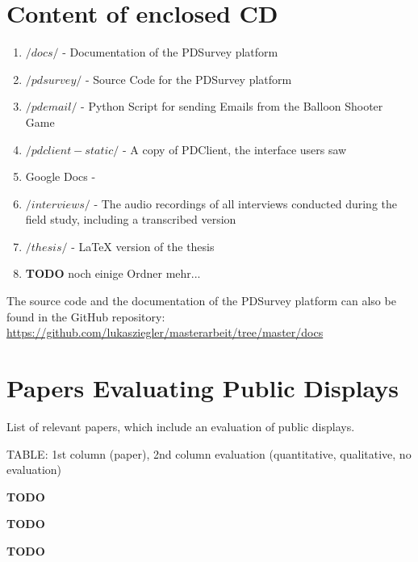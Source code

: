 \section{Content of enclosed CD}
\label{appendix:cd-contents}


    \begin{enumerate}
    \item $/docs/$ - Documentation of the PDSurvey platform
    \item $/pdsurvey/$ - Source Code for the PDSurvey platform
    \item $/pdemail/$ - Python Script for sending Emails from the Balloon Shooter Game
    \item $/pdclient-static/$ - A copy of PDClient, the interface users saw
    \item Google Docs - 
    \item $/interviews/$ - The audio recordings of all interviews conducted during the field study, including a transcribed version
    \item $/thesis/$ - LaTeX version of the thesis
    \item \textbf{TODO} noch einige Ordner mehr...
    \end{enumerate}

  The source code and the documentation of the PDSurvey platform can also be found in the GitHub repository: \url{https://github.com/lukasziegler/masterarbeit/tree/master/docs}



\clearpage
\section{Papers Evaluating Public Displays}
  
  List of relevant papers, which include an evaluation of public displays.

  TABLE: 1st column (paper), 2nd column evaluation (quantitative, qualitative, no evaluation)

  \textbf{TODO}

  \textbf{TODO}

  \textbf{TODO}









\clearpage

\label{appendix:interviews}

